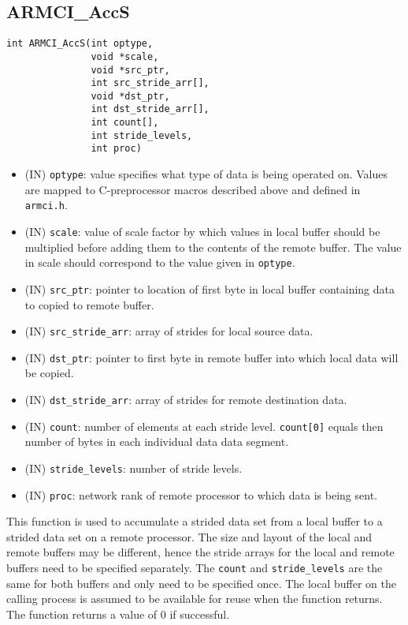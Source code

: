 \documentclass[12pt]{article}
\begin{document}
\subsection{ARMCI\_AccS}
\begin{verbatim}
int ARMCI_AccS(int optype,
               void *scale,
               void *src_ptr,
               int src_stride_arr[],
               void *dst_ptr,
               int dst_stride_arr[],
               int count[],
               int stride_levels,
               int proc)
\end{verbatim}
\begin{itemize}
\item (IN) \texttt{optype}: value specifies what type of data is being operated
on. Values are mapped to C-preprocessor macros described above and defined in
\texttt{armci.h}.
\item (IN) \texttt{scale}: value of scale factor by which values in local buffer
should be multiplied before adding them to the contents of the remote buffer.
The value in scale should correspond to the value given in \texttt{optype}.
\item (IN) \texttt{src\_ptr}: pointer to location of first byte in local buffer
containing data to copied to remote buffer.
\item (IN) \texttt{src\_stride\_arr}: array of strides for local source data.
\item (IN) \texttt{dst\_ptr}: pointer to first byte in remote buffer into which local
data will be copied.
\item (IN) \texttt{dst\_stride\_arr}: array of strides for remote destination data.
\item (IN) \texttt{count}: number of elements at each stride level.
\texttt{count[0]} equals then number of bytes in each individual data data segment.
\item (IN) \texttt{stride\_levels}: number of stride levels.
\item (IN) \texttt{proc}: network rank of remote processor to which data is
being sent.
\end{itemize}
This function is used to accumulate a strided data set from a local buffer to a
strided data set on a remote processor. The size and layout of the local and
remote buffers may be different, hence the stride arrays for the local and
remote buffers need to be specified separately. The \texttt{count} and
\texttt{stride\_levels} are the same for both buffers and only need to be
specified once. The local buffer on the calling process is assumed to be
available for reuse when the function returns. The function returns a value of 0
if successful.
\end{document}
